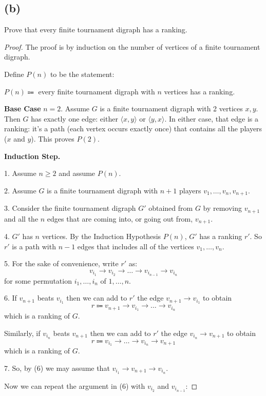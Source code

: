 \documentclass[14pt]{extarticle}
\begin{document}
\subsection{(b)}
Prove that every finite tournament digraph has a ranking.
\begin{proof}
The proof is by induction on the number of vertices of a finite tournament digraph.

Define $P(n)$ to be the statement:
\begin{center}
$P(n) \Coloneqq $ every finite tournament digraph with $n$ vertices has a ranking.
\end{center}

{\bf Base Case} $n = 2$. Assume $G$ is a finite tournament digraph with 2 vertices $x, y$. Then $G$ has exactly one edge: either $\langle x,y \rangle$ or $\langle y,x \rangle$. In either case, that edge is a ranking: it's a path (each vertex occurs exactly once) that contains all the players ($x$ and $y$). This proves $P(2)$.

{\bf Induction Step.} 

1. Assume $n \geq 2$ and assume $P(n)$.

2. Assume $G$ is a finite tournament digraph with $n+1$ players $v_1, \ldots, v_n, v_{n+1}$.

3. Consider the finite tournament digraph $G'$ obtained from $G$ by removing $v_{n+1}$ and all the $n$ edges that are coming into, or going out from, $v_{n+1}$.

4. $G'$ has $n$ vertices. By the Induction Hypothesis $P(n)$, $G'$ has a ranking $r'$. So $r'$ is a path with $n-1$ edges that includes all of the vertices $v_1, \ldots, v_n$.

5. For the sake of convenience, write $r'$ as: 
$$
v_{i_1} \to v_{i_2} \to \ldots \to v_{i_{n-1}} \to v_{i_n}
$$ 
for some permutation $i_1, \ldots, i_n$ of $1, \ldots, n$.

6. If $v_{n+1}$ beats $v_{i_1}$ then we can add to $r'$ the edge $v_{n+1} \to v_{i_1}$ to obtain
$$
r \Coloneqq v_{n+1} \to v_{i_1} \to \ldots \to v_{i_n}
$$
which is a ranking of $G$.

Similarly, if $v_{i_n}$ beats $v_{n+1}$ then we can add to $r'$ the edge $v_{i_n} \to v_{n+1}$ to obtain
$$
r \Coloneqq v_{i_1} \to \ldots \to v_{i_n} \to v_{n+1} 
$$
which is a ranking of $G$.

7. So, by (6) we may assume that $v_{i_1} \to v_{n+1} \to v_{i_n}$.    

Now we can repeat the argument in (6) with $v_{i_2}$ and $v_{i_{n-1}}$:


\end{proof}
\end{document}
